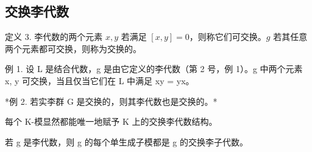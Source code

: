 \subsection{交换李代数}

定义 3. 李代数的两个元素 \(x, y\) 若满足 \([x, y] = 0\)，则称它们可交换。\(g\) 若其任意两个元素都可交换，则称为交换的。

例 1. 设 L 是结合代数，g 是由它定义的李代数（第 2 号，例 1）。g 中两个元素 x, y 可交换，当且仅当它们在 L 中满足 xy = yx。

*例 2. 若实李群 G 是交换的，则其李代数也是交换的。*

每个 K-模显然都能唯一地赋予 K 上的交换李代数结构。

若 g 是李代数，则 g 的每个单生成子模都是 g 的交换李子代数。

